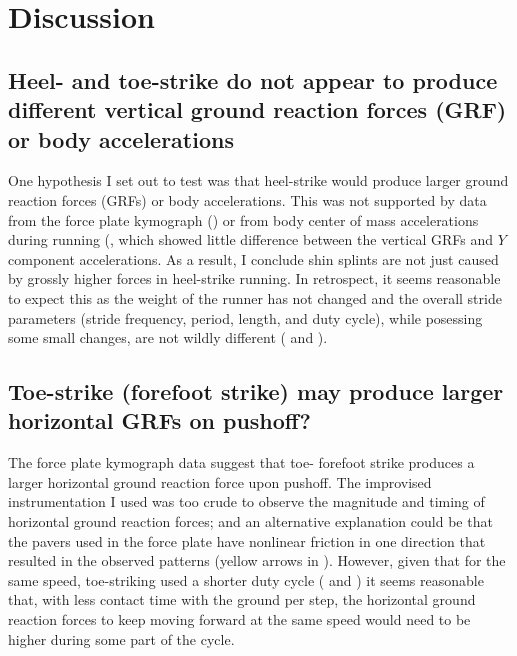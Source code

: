 \section{Discussion}
\label{sec:discussion}

\subsection{Heel- and toe-strike do not appear to produce different vertical ground reaction forces (GRF) or body accelerations}

One hypothesis I set out to test was that heel-strike would produce larger ground reaction forces (GRFs) or body accelerations. This was not supported by data from the force plate kymograph () or from body center of mass accelerations during running (, which showed little difference between the vertical GRFs and $Y$ component accelerations. As a result, I conclude shin splints are not just caused by grossly higher forces in heel-strike running. In retrospect, it seems reasonable to expect this as the weight of the runner has not changed and the overall stride parameters (stride frequency, period, length, and duty cycle), while posessing some small changes, are not wildly different ( and ). 



\subsection{Toe-strike (forefoot strike) may produce larger horizontal GRFs on pushoff?}

The force plate kymograph data suggest that toe- forefoot strike produces a larger horizontal ground reaction force upon pushoff. The improvised instrumentation I used was too crude to observe the magnitude and timing of horizontal ground reaction forces; and an alternative explanation could be that the pavers used in the force plate have nonlinear friction in one direction that resulted in the observed patterns (yellow arrows in ). However, given that for the same speed, toe-striking used a shorter duty cycle ( and ) it seems reasonable that, with less contact time with the ground per step, the horizontal ground reaction forces to keep moving forward at the same speed would need to be higher during some part of the cycle.



